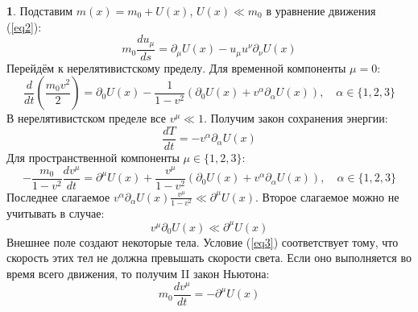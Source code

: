 \documentclass[12pt]{article}
\theoremstyle{definition}
\newtheorem{zad}{}[section]
\begin{document}
\begin{zad}
Подставим $m(x)=m_0+U(x)$, $U(x)\ll m_0$ в уравнение движения (\ref{eq2}):
\begin{equation}
    m_0\frac{du_\mu}{ds}=\partial_\mu U(x)-u_\mu u^\nu\partial_\nu U(x)
\end{equation}
Перейдём к нерелятивистскому пределу. Для временной компоненты $\mu=0$:
\begin{equation}
    \frac{d}{dt}\left(\frac{m_0 v^2}{2}\right)=\partial_0U(x)-\frac{1}{1-v^2}(\partial_0U(x)+v^\alpha\partial_\alpha U(x)),\quad \alpha\in\{1,2,3\}
\end{equation}
В нерелятивистском пределе все $v^\mu\ll1$. Получим закон сохранения энергии:
\begin{equation}
    \boxed{\frac{dT}{dt}=-v^\alpha\partial_\alpha U(x)}
\end{equation}
Для пространственной компоненты $\mu\in\{1,2,3\}$:
\begin{equation}
    -\frac{m_0}{1-v^2}\frac{dv^\mu}{dt}=\partial^\mu U(x)+\frac{v^
    \mu}{1-v^2}(\partial_0U(x)+v^\alpha\partial_\alpha U(x)),\quad \alpha\in\{1,2,3\}
\end{equation}
Последнее слагаемое $v^\alpha\partial_\alpha U(x)\frac{v^\mu}{1-v^2}\ll\partial^\mu U(x)$. Второе слагаемое можно не учитывать в случае:
\begin{equation}\label{eq3}
    \boxed{v^\mu\partial_0U(x)\ll \partial^\mu U(x)}
\end{equation}
Внешнее поле создают некоторые тела. Условие (\ref{eq3}) соответствует тому, что скорость этих тел не должна превышать скорости света. Если оно выполняется во время всего движения, то получим II закон Ньютона:
\begin{equation}
    \boxed{m_0\frac{dv^\mu}{dt}=-\partial^\mu U(x)}
\end{equation}
\end{zad}
\end{document}
